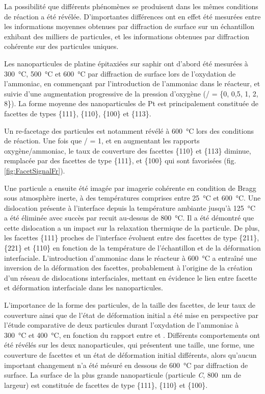 La possibilité que différents phénomènes se produisent dans les mêmes conditions de réaction a été révélée.
D'importantes différences ont en effet été mesurées entre les informations moyennes obtenues par diffraction de surface sur un échantillon exhibant des milliers de particules, et les informations obtenues par diffraction cohérente sur des particules uniques.

Les nanoparticules de platine épitaxiées sur saphir ont d'abord été mesurées à \qty{300}{\degreeCelsius}, \qty{500}{\degreeCelsius} et \qty{600}{\degreeCelsius} par diffraction de surface lors de l'oxydation de l'ammoniac, en commençant par l'introduction de l'ammoniac dans le réacteur, et suivie d'une augmentation progressive de la pression d'oxygène (/ = \{0, 0,5, 1, 2, 8\}).
La forme moyenne des nanoparticules de Pt est principalement constituée de facettes de types \{111\}, \{110\}, \{100\} et \{113\}.

Un re-facetage des particules est notamment révélé à \qty{600}{\degreeCelsius} lors des conditions de réaction.
Une fois que / = 1, et en augmentant les rapports oxygène/ammoniac, le taux de couverture des facettes \{110\} et \{113\} diminue, remplacée par des facettes de type \{111\}, et \{100\} qui sont favorisées (fig. \ref{fig:FacetSignalFr}).

Une particule a ensuite été imagée par imagerie cohérente en condition de Bragg sous atmosphère inerte, à des températures comprises entre \qty{25}{\degreeCelsius} et \qty{600}{\degreeCelsius}.
Une dislocation présente à l'interface depuis la température ambiante jusqu'à \qty{125}{\degreeCelsius} a été éliminée avec succès par recuit au-dessus de \qty{800}{\degreeCelsius}.
Il a été démontré que cette dislocation a un impact sur la relaxation thermique de la particule.
De plus, les facettes \{111\} proches de l'interface évoluent entre des facettes de type \{211\}, \{221\} et \{110\} en fonction de la température de l'échantillon et de la déformation interfaciale.
L'introduction d'ammoniac dans le réacteur à \qty{600}{\degreeCelsius} a entraîné une inversion de la déformation des facettes, probablement à l'origine de la création d'un réseau de dislocations interfaciales, mettant en évidence le lien entre facette et déformation interfaciale dans les nanoparticules.

L'importance de la forme des particules, de la taille des facettes, de leur taux de couverture ainsi que de l'état de déformation initial a été mise en perspective par l'étude comparative de deux particules durant l'oxydation de l'ammoniac à \qty{300}{\degreeCelsius} et \qty{400}{\degreeCelsius}, en fonction du rapport entre  et .
Différents comportements ont été révélés sur les deux nanoparticules, qui présentent une taille, une forme, une couverture de facettes et un état de déformation initial différents, alors qu'aucun important changement n'a été mésuré en dessous de \qty{600}{\degreeCelsius} par diffraction de surface.
La surface de la plus grande nanoparticule (particule \textit{C}, \qty{800}{\nm} de largeur) est constituée de facettes de type \{111\}, \{110\} et \{100\}.

